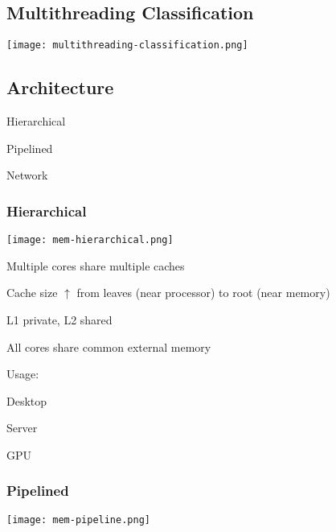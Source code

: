 \documentclass[12pt]{article}
\begin{document}
\begin{spacing}{1.5}
\subsection{Multithreading Classification}

\begin{center}
\texttt{[image: multithreading-classification.png]}
\end{center}

\subsection{Architecture}

\begin{itemize*}
	\item Hierarchical
	\item Pipelined
	\item Network
\end{itemize*}

\subsubsection{Hierarchical}

\begin{center}
\texttt{[image: mem-hierarchical.png]}
\end{center}

\begin{itemize*}
	\item Multiple cores share multiple caches
	\item Cache size $\uparrow$ from leaves (near processor) to root (near memory)
	\item L1 private, L2 shared
	\item All cores share common external memory
	\item Usage: 
		\begin{itemize*}
			\item Desktop
			\item Server
			\item GPU
		\end{itemize*} 
\end{itemize*}

\subsubsection{Pipelined}

\begin{center}
\texttt{[image: mem-pipeline.png]}
\end{center}


\end{spacing}
\end{document}
